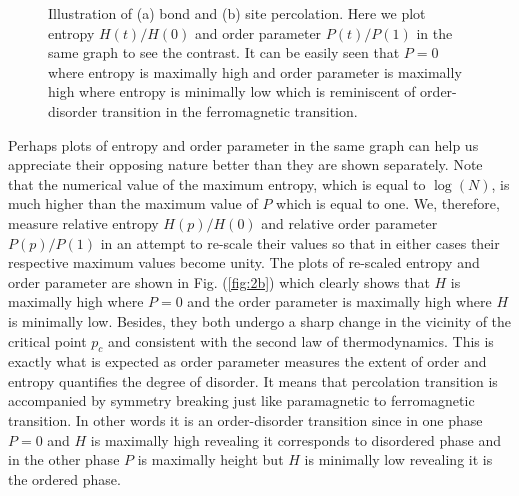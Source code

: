 \documentclass[twocolumn,showpacs,preprintnumbers,amsmath,amssymb]{article}
\begin{document}
\begin{figure}

\centering




\subfloat[]
{
\label{fig:2a}
}

\subfloat[]
{
\label{fig:2b}
}


\caption{Illustration of (a) bond and (b) site percolation. Here we plot entropy $H(t)/H(0)$ and order parameter $P(t)/P(1)$
in the same graph to see the contrast.  It can be easily seen that $P=0$ where
entropy is maximally high and order parameter is maximally high where entropy is minimally low
which is reminiscent of order-disorder transition in the ferromagnetic transition.
} 

\label{fig:bond_site_ab}
\end{figure}

Perhaps plots of entropy and order parameter
in the same graph can help us appreciate their opposing nature better than they are shown separately. 
Note that the numerical value of the maximum 
entropy, which is equal to $\log (N)$, is much higher than the maximum value of $P$ which is equal to one. 
We, therefore, measure relative entropy $H(p)/H(0)$ and relative order parameter $P(p)/P(1)$ 
in an attempt to re-scale their values so that in either cases their respective maximum values become
unity. The plots of re-scaled entropy and order parameter
are shown in Fig. (\ref{fig:2b}) which clearly shows that $H$ is maximally high where $P=0$ and the order parameter is maximally high 
where $H$ is minimally low. Besides, they both undergo a sharp change in the vicinity of the critical point $p_c$ and consistent with the second law of thermodynamics. This is exactly what is expected as order
parameter measures the extent of order and entropy quantifies the degree of disorder. 
It means that percolation transition 
is accompanied by symmetry breaking just like paramagnetic to ferromagnetic
transition. In other words 
it is an order-disorder transition since in one phase $P=0$ and $H$ is maximally high revealing
it corresponds to disordered phase and in the other phase $P$ is maximally height but $H$ is minimally low revealing
it is the ordered phase.


 
\end{document}
